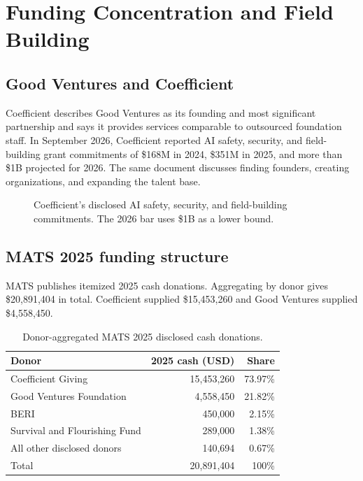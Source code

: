 \documentclass[11pt,twoside]{article}
\begin{document}
\section{Funding Concentration and Field Building}
\subsection{Good Ventures and Coefficient}
Coefficient describes Good Ventures as its founding and most significant partnership and says it provides services comparable to outsourced foundation staff. In September 2026, Coefficient reported AI safety, security, and field-building grant commitments of \$168M in 2024, \$351M in 2025, and more than \$1B projected for 2026. The same document discusses finding founders, creating organizations, and expanding the talent base.

\begin{figure}[ht]
\centering
{}
\caption{Coefficient's disclosed AI safety, security, and field-building commitments. The 2026 bar uses \$1B as a lower bound.}
\end{figure}

\subsection{MATS 2025 funding structure}
MATS publishes itemized 2025 cash donations. Aggregating by donor gives \$20,891,404 in total. Coefficient supplied \$15,453,260 and Good Ventures supplied \$4,558,450.

\begin{table}[ht]
\centering\small
\begin{tabular}{lrr}
\toprule
Donor & 2025 cash (USD) & Share \\
\midrule
Coefficient Giving & 15,453,260 & 73.97\% \\
Good Ventures Foundation & 4,558,450 & 21.82\% \\
BERI & 450,000 & 2.15\% \\
Survival and Flourishing Fund & 289,000 & 1.38\% \\
All other disclosed donors & 140,694 & 0.67\% \\
\midrule
Total & 20,891,404 & 100\% \\
\bottomrule
\end{tabular}
\caption{Donor-aggregated MATS 2025 disclosed cash donations.}
\end{table}
\end{document}
